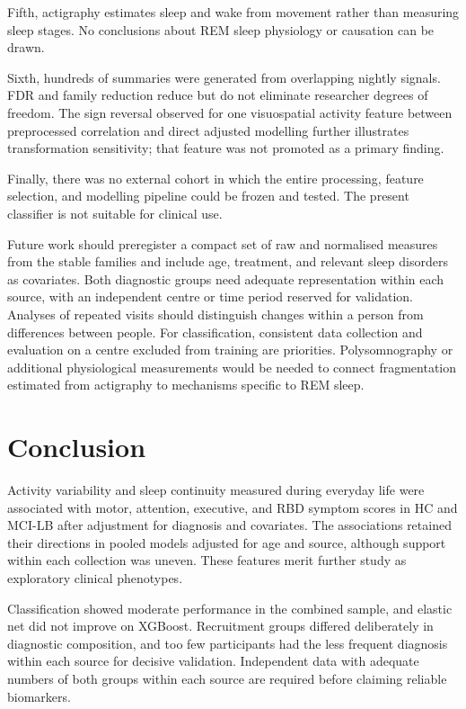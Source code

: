 \documentclass[referee,pdflatex,sn-vancouver-num]{sn-jnl}
\begin{document}
Fifth, actigraphy estimates sleep and wake from movement rather than measuring
sleep stages. No conclusions about REM sleep physiology or causation can be
drawn. 

Sixth, hundreds of summaries were generated from overlapping nightly
signals. FDR and family reduction reduce but do not eliminate researcher
degrees of freedom. The sign reversal observed for one visuospatial activity
feature between preprocessed correlation and direct adjusted modelling further
illustrates transformation sensitivity; that feature was not promoted as a
primary finding. 

Finally, there was no external cohort in which the entire processing, feature selection,
and modelling pipeline could be frozen and tested. The present classifier is
not suitable for clinical use.

Future work should preregister a compact set of raw and normalised measures
from the stable families and include age, treatment, and relevant sleep
disorders as covariates. Both diagnostic groups need adequate representation
within each source, with an independent centre or time period reserved for
validation. Analyses of repeated visits should distinguish changes within a
person from differences between people. For classification, consistent data
collection and evaluation on a centre excluded from training are priorities.
Polysomnography or additional physiological measurements would be needed to
connect fragmentation estimated from actigraphy to mechanisms specific to REM sleep.

\section{Conclusion}\label{sec:conclusion}

Activity variability and sleep continuity measured during everyday life were
associated with motor, attention, executive, and RBD symptom scores in HC and
MCI-LB after adjustment for diagnosis and covariates. The associations retained
their directions in pooled models adjusted for age and source, although support
within each collection was uneven. These features merit further study as
exploratory clinical phenotypes.

Classification showed moderate performance in the combined sample, and elastic
net did not improve on XGBoost. Recruitment groups differed deliberately in
diagnostic composition, and too few participants had the less frequent diagnosis
within each source for decisive validation. Independent data with adequate
numbers of both groups within each source are required before claiming reliable
biomarkers.
\end{document}
